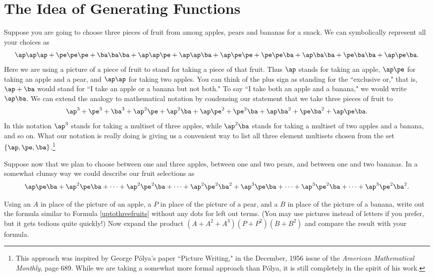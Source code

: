 \section{The Idea of Generating Functions} Suppose you are going to choose
three pieces of fruit from among apples, pears and bananas for a snack. 
We can symbolically represent all your choices as
$$\ap\ap\ap+\pe\pe\pe+\ba\ba\ba+\ap\ap\pe+\ap\ap\ba+\ap\pe\pe +\pe\pe\ba
+\ap\ba\ba+\pe\ba\ba+\ap\pe\ba.$$
Here we are using a picture of a piece of fruit to stand for taking a
piece of that fruit.  Thus $\ap$ stands for taking an apple, $\ap\pe$ for
taking an apple and a pear, and
$\ap\ap$ for taking two apples.  
You can think of the plus sign as standing for the ``exclusive or," that
is,
$\ap+\ba$ would stand for ``I take an apple or a banana but not both."  To
say ``I take both an apple and a banana," we would write $\ap\ba$.  We can
extend the analogy to mathematical notation by condensing our statement
that we take three pieces of fruit to
$$\ap^3+\pe^3+\ba^3+\ap^2\pe+\ap^2\ba +\ap\pe^2+\pe^2\ba+
\ap\ba^2+\pe\ba^2 +\ap\pe\ba.$$
In this notation $\ap^3$ stands for taking a multiset of three apples,
while $\ap^2\ba$ stands for taking a multiset of two apples and a banana,
and so on.  What our notation is really doing is giving us a convenient
way to list all three element multisets chosen from the
set $\{\ap,\pe,\ba\}$.\footnote{This approach was inspired by George
P\'olya's paper ``Picture Writing," in the December, 1956 issue of the
{\em American Mathematical Monthly}, page 689. While we are taking a
somewhat more formal approach than P\'olya, it is still completely in the
spirit of his work.}

Suppose now that we plan to choose between one and three apples, between
one and two pears, and between one and two bananas.  In a somewhat clumsy
way we could describe our fruit selections as
\begin{equation} \ap\pe\ba+\ap^2\pe\ba+\cdots+\ap^2\pe^2\ba+\cdots +
\ap^2\pe^2\ba^2+\ap^3\pe\ba+
\cdots +\ap^3\pe^2\ba+\cdots +
\ap^3\pe^2\ba^2.\label{uptothreefruits}\end{equation}

\bp \iteme Using an $A$ in place of the picture of an apple, a $P$ in
place of the picture of a pear, and a $B$ in place of the picture of a
banana, write out the formula similar to Formula \ref{uptothreefruits}
without any dots for left out terms.  (You may use pictures instead of
letters if you prefer, but it gets tedious quite quickly!)  Now expand
the product
$(A+A^2+A^3)(P+P^2)(B+B^2)$ and compare the result with your formula.
\label{twopiecesoffruit}


